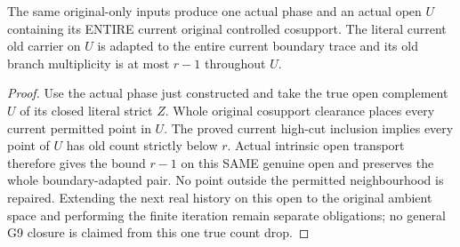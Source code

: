 \begin{theorem}
\label{hir:nc-original-phase-whole-cosupport-count-drop}
\leanok
The same original-only inputs produce one actual phase and an actual open
$U$ containing its ENTIRE current original controlled cosupport. The literal
current old carrier on $U$ is adapted to the entire current boundary trace
and its old branch multiplicity is at most $r-1$ throughout $U$.
\end{theorem}
\begin{proof}
Use the actual phase just constructed and take the true open complement
$U$ of its closed literal strict $Z$. Whole original cosupport clearance
places every current permitted point in $U$. The proved current high-cut
inclusion implies every point of $U$ has old count strictly below $r$.
Actual intrinsic open transport therefore gives the bound $r-1$ on this
SAME genuine open and preserves the whole boundary-adapted pair. No point
outside the permitted neighbourhood is repaired. Extending the next real
history on this open to the original ambient space and performing the
finite iteration remain separate obligations; no general G9 closure is
claimed from this one true count drop.
\end{proof}
